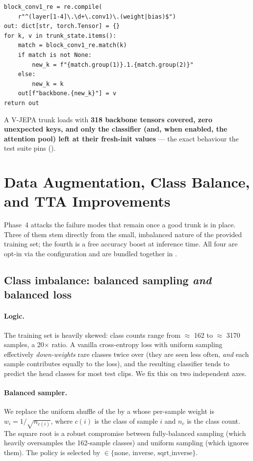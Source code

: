 \begin{lstlisting}[style=py]
block_conv1_re = re.compile(
    r"^(layer[1-4]\.\d+\.conv1)\.(weight|bias)$")
out: dict[str, torch.Tensor] = {}
for k, v in trunk_state.items():
    match = block_conv1_re.match(k)
    if match is not None:
        new_k = f"{match.group(1)}.1.{match.group(2)}"
    else:
        new_k = k
    out[f"backbone.{new_k}"] = v
return out
\end{lstlisting}

A V-JEPA trunk loads with \textbf{318 backbone tensors covered, zero
unexpected keys, and only the classifier (and, when enabled, the
attention pool) left at their fresh-init values} --- the exact behaviour
the test suite pins ().

\section{Data Augmentation, Class Balance, and TTA Improvements}
\label{sec:tracka-phase4}

Phase~4 attacks the failure modes that remain once a good trunk is in
place. Three of them stem directly from the small, imbalanced nature of
the provided training set; the fourth is a free accuracy boost at
inference time. All four are opt-in via the configuration and are
bundled together in
.

\subsection{Class imbalance: balanced sampling \emph{and} balanced loss}
\label{sec:tracka-phase4:classbalance}

\paragraph{Logic.} The training set is heavily skewed: class counts
range from \(\approx\) 162 to \(\approx\) 3170 samples, a 20\(\times\)
ratio. A vanilla cross-entropy loss with uniform sampling effectively
\emph{down-weights} rare classes twice over (they are seen less often,
\emph{and} each sample contributes equally to the loss), and the
resulting classifier tends to predict the head classes for most test
clips. We fix this on two independent axes.

\paragraph{Balanced sampler.} We replace the uniform shuffle of the
 by a  whose per-sample
weight is \(w_i = 1 / \sqrt{n_{c(i)}}\), where \(c(i)\) is the class
of sample \(i\) and \(n_c\) is the class count. The square root is a
robust compromise between fully-balanced sampling (which heavily
oversamples the 162-sample classes) and uniform sampling (which
ignores them). The policy is selected by
 \(\in
\{\text{none, inverse, sqrt\_inverse}\}\).

